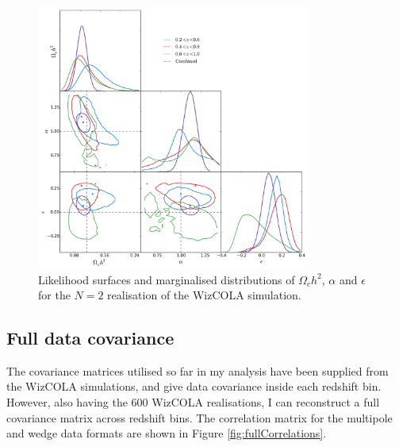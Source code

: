 \documentclass[titlesmallcaps, examinerscopy, copyrightpage]{uqthesis}
\begin{document}
\begin{figure}[h!]
  \begin{center}
    \includegraphics[width=0.8\textwidth]{images/corCombined_2.pdf}
  \end{center}
  \caption{Likelihood surfaces and marginalised distributions of $\Omega_ch^2$, $\alpha$ and $\epsilon$ for the $N=2$ realisation of the WizCOLA simulation.}
  \label{fig:corCombined_2}
\end{figure}




\newpage\phantom{blabla}\newpage
\subsection{Full data covariance}

The covariance matrices utilised so far in my analysis have been supplied from the WizCOLA simulations, and give data covariance inside each redshift bin. However, also having the 600 WizCOLA realisations, I can reconstruct a full covariance matrix across redshift bins. The correlation matrix for the multipole and wedge data formats are shown in Figure \ref{fig:fullCorrelations}.\\
\end{document}
